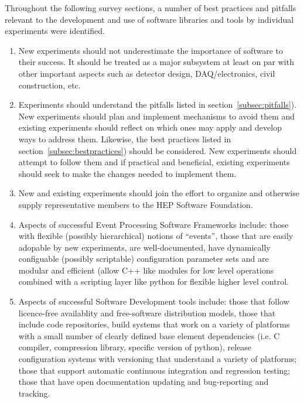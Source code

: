 Throughout the following survey sections, a number of best practices
and pitfalls relevant to the development and use of software libraries
and tools by individual experiments were identified.

\begin{enumerate}

\item New experiments should not underestimate the importance of
  software to their success.  It should be treated as a major
  subsystem at least on par with other important aspects such as
  detector design, DAQ/electronics, civil construction, etc.

\item Experiments should understand the pitfalls listed in
  section~\ref{subsec:pitfalls}).  New experiments should plan and
  implement mechanisms to avoid them and existing experiments should
  reflect on which ones may apply and develop ways to address them.
  Likewise, the best practices listed in
  section~\ref{subsec:bestpractices}) should be considered.  New
  experiments should attempt to follow them and if practical and
  beneficial, existing experiments should seek to make the changes
  needed to implement them.

\item New and existing experiments should join the effort to organize
  and otherwise supply representative members to the HEP Software
  Foundation.

\item Aspects of successful Event Processing Software Frameworks include: 
those with flexible (possibly hierarchical) notions of ``events'', 
those that are easily adopable by new experiments, are well-documented, 
have dynamically configuable (possibly scriptable) configuration 
parameter sets and are modular and efficient (allow C++ like modules 
for low level 
operations combined with a scripting layer like python for flexible 
higher level control.

\item Aspects of successful Software Development tools include:
those that follow licence-free availablity and free-software distribution models, 
those that include code repositories, build systems that work on a variety of platforms 
with a small number of clearly defined base element dependencies 
(i.e. C compiler, compression library, specific version of python), release 
configuration systems with versioning that understand a variety of 
platforms; those that support automatic continuous integration and 
regression testing; those that have open documentation updating and  
bug-reporting and tracking.


\end{enumerate}
